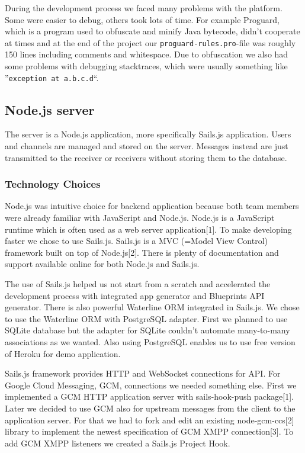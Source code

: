 During the development process we faced many problems with the platform. Some were easier to debug, others took lots of time. For example Proguard, which is a program used to obfuscate and minify Java bytecode, didn't cooperate at times and at the end of the project our \verb|proguard-rules.pro|-file was roughly 150 lines including comments and whitespace. Due to obfuscation we also had some problems with debugging stacktraces, which were usually something like ''\verb|exception at a.b.c.d|``. 

\subsection{Node.js server}
The server is a Node.js application, more specifically Sails.js application. Users and channels are managed and stored on the server. Messages instead are just transmitted to the receiver or receivers without storing them to the database. 

\subsubsection{Technology Choices}
Node.js was intuitive choice for backend application because both team members were already familiar with JavaScript and Node.js. Node.js is a JavaScript runtime which is often used as a web server application[1]. To make developing faster we chose to use Sails.js. Sails.js is a MVC (=Model View Control) framework built on top of Node.js[2]. There is plenty of documentation and support available online for both Node.js and Sails.js.

The use of Sails.js helped us not start from a scratch and accelerated the development process with integrated app generator and Blueprints API generator. There is also powerful Waterline ORM integrated in Sails.js. We chose to use the Waterline ORM with PostgreSQL adapter. First we planned to use SQLite database but the adapter for SQLite couldn't automate many-to-many associations as we wanted. Also using PostgreSQL enables us to use free version of Heroku for demo application.

Sails.js framework provides HTTP and WebSocket connections for API. For Google Cloud Messaging, GCM, connections we needed something else. First we implemented a GCM HTTP application server with sails-hook-push package[1]. Later we decided to use GCM also for upstream messages from the client to the application server. For that we had to fork and edit an existing node-gcm-ccs[2] library to implement the newest specification of GCM XMPP connection[3]. To add GCM XMPP listeners we created a Sails.js Project Hook.

